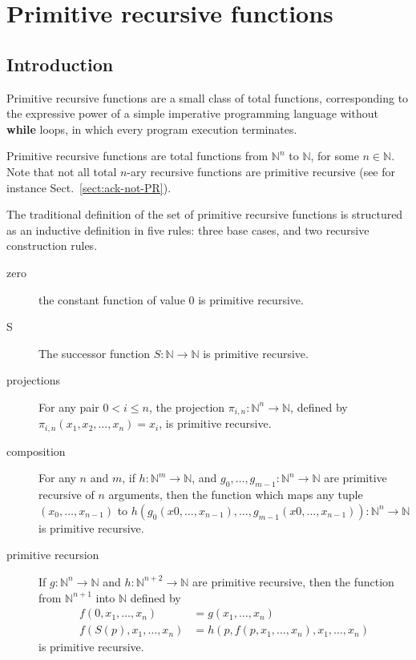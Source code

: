 \chapter{Primitive recursive functions}

\section{Introduction}
Primitive recursive functions are a small class of total functions, corresponding to the expressive power of a simple imperative programming language without \textbf{while} loops, in which every program execution terminates.

Primitive recursive functions are total functions from $\mathbb{N}^n$ to
$\mathbb{N}$, for some $n\in\mathbb{N}$. Note that not all 
total $n$-ary recursive functions are primitive recursive
(see for instance Sect.~\vref{sect:ack-not-PR}).

The traditional definition of the set of primitive recursive functions is structured as an inductive definition 
in five rules: three base cases, and two recursive construction rules. 

\begin{description}
  \item[zero] the constant function of value $0$ is primitive recursive.
\item[S] The successor function $S:\mathbb{N}\rightarrow\mathbb{N}$ is primitive recursive.
 \item[projections] For any pair $0< i\leq n$, the projection $\pi_{i,n}: \mathbb{N}^n\rightarrow\mathbb{N}$, defined by $\pi_{i,n}(x_1,x_2,\dots,x_{n})=x_i$, is primitive recursive.
\item[composition] For any $n$ and $m$, if $h: \mathbb{N}^m\rightarrow\mathbb{N}$, and
$g_0,\dots, g_{m-1}: \mathbb{N}^n\rightarrow\mathbb{N}$ are primitive recursive of $n$ arguments, then the function which maps any
tuple $(x_0,\dots,x_{n-1})$ to $h(g_0(x0,\dots,x_{n-1}),\dots, g_{m-1}(x0,\dots,x_{n-1})): \mathbb{N}^n\rightarrow\mathbb{N}$ is primitive recursive.
\item[primitive recursion]
If $g: \mathbb{N}^n\rightarrow\mathbb{N}$ and $h: \mathbb{N}^{n+2}\rightarrow\mathbb{N}$ are primitive recursive, then the function from $\mathbb{N}^{n+1}$ into $\mathbb{N}$ defined by
\begin{align}
f(0,x_1,\dots,x_n)&=g(x_1,\dots,x_n)\\
f(S(p),x_1,\dots,x_n)&=h(p,f(p, x_1,\dots,x_n),  x_1,\dots,x_n)
\end{align} 
is primitive recursive.
\end{description}


